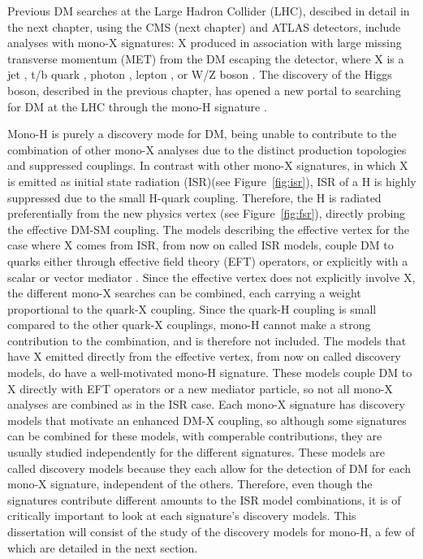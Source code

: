 Previous DM searches at the Large Hadron Collider (LHC), descibed in detail in the next chapter, using the CMS (next chapter) and ATLAS detectors, include analyses with mono-X signatures: X produced in association with large missing transverse momentum (MET) from the DM escaping the detector, where X is a jet \cite{Aad:2015zva, Khachatryan:2014rra}, t/b quark \cite{Aad:2014vea, Khachatryan:2014uma, Khachatryan:2015nua}, photon \cite{Aad:2014tda, Chatrchyan:2012tea, Khachatryan:2014rwa}, lepton \cite{Khachatryan:2014tva, ATLAS:2014wra}, or W/Z boson \cite{Aad:2014vka, Aad:2013oja, Khachatryan:2015bbl}. The discovery of the Higgs boson, described in the previous chapter, has opened a new portal to searching for DM at the LHC through the mono-H signature \cite{Carpenter:2013xra, Berlin:2014cfa}. 

\indent Mono-H is purely a discovery mode for DM, being unable to contribute to the combination of other mono-X analyses due to the distinct production topologies and suppressed couplings. In contrast with other mono-X signatures, in which X is emitted as initial state radiation (ISR)(see Figure~\ref{fig:isr}), ISR of a H is highly suppressed due to the small H-quark coupling. Therefore, the H is radiated preferentially from the new physics vertex (see Figure~\ref{fig:fsr}), directly probing the effective DM-SM coupling. The models describing the effective vertex for the case where X comes from ISR, from now on called ISR models, couple DM to quarks either through effective field theory (EFT) operators, or explicitly with a scalar or vector mediator \cite{Abercrombie:2015wmb}. Since the effective vertex does not explicitly involve X, the different mono-X searches can be combined, each carrying a weight proportional to the quark-X coupling. Since the quark-H coupling is small compared to the other quark-X couplings, mono-H cannot make a strong contribution to the combination, and is therefore not included. The models that have X emitted directly from the effective vertex, from now on called discovery models, do have a well-motivated mono-H signature. These models couple DM to X directly with EFT operators or a new mediator particle, so not all mono-X analyses are combined as in the ISR case. Each mono-X signature has discovery models that motivate an enhanced DM-X coupling, so although some signatures can be combined for these models, with comperable contributions, they are usually studied independently for the different signatures. These models are called discovery models because they each allow for the detection of DM for each mono-X signature, independent of the others. Therefore, even though the signatures contribute different amounts to the ISR model combinations, it is of critically important to look at each signature's discovery models. This dissertation will consist of the study of the discovery models for mono-H, a few of which are detailed in the next section. 


